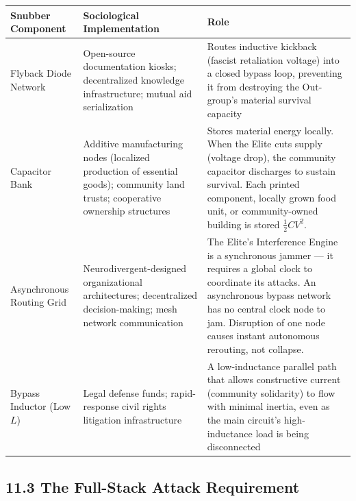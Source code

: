 \documentclass[12pt]{book}
\numberwithin{equation}{chapter}
\begin{document}
\begin{center}
\begin{tabular}{lll}
\toprule
Snubber Component & Sociological Implementation & Role  \\
\midrule
Flyback Diode Network & Open-source documentation kiosks; decentralized knowledge infrastructure; mutual aid serialization & Routes inductive kickback (fascist retaliation voltage) into a closed bypass loop, preventing it from destroying the Out-group's material survival capacity  \\
Capacitor Bank & Additive manufacturing nodes (localized production of essential goods); community land trusts; cooperative ownership structures & Stores material energy locally. When the Elite cuts supply (voltage drop), the community capacitor discharges to sustain survival. Each printed component, locally grown food unit, or community-owned building is stored $\frac{1}{2}CV^2$.  \\
Asynchronous Routing Grid & Neurodivergent-designed organizational architectures; decentralized decision-making; mesh network communication & The Elite's Interference Engine is a synchronous jammer — it requires a global clock to coordinate its attacks. An asynchronous bypass network has no central clock node to jam. Disruption of one node causes instant autonomous rerouting, not collapse.  \\
Bypass Inductor (Low $L$) & Legal defense funds; rapid-response civil rights litigation infrastructure & A low-inductance parallel path that allows constructive current (community solidarity) to flow with minimal inertia, even as the main circuit's high-inductance load is being disconnected  \\
\bottomrule
\end{tabular}
\end{center}

\subsection{11.3 The Full-Stack Attack Requirement}
\end{document}

